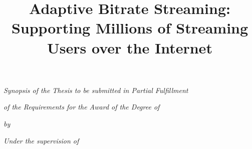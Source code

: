 \title{\fontsize{18}{18} \textbf{Adaptive Bitrate Streaming: Supporting Millions of Streaming Users over the Internet}}

\date{{}}

\vspace{-3.0cm}

\maketitle
\thispagestyle{empty}


{\centering \fontsize{13}{13} \em Synopsis of the Thesis to be
submitted in Partial Fulfillment \par}

{\centering \fontsize{13}{13} \em of the Requirements for the
Award of the Degree of\par}


\vspace{1.0cm}

{\par}

\vspace{0.8cm}

{\centering \fontsize{13}{13} \em by\par}

\vspace{0.5cm}

{\par}

\vspace{0.25cm}

{\par}

\vspace{1.0cm}

{\centering \fontsize{13}{13} \em Under the supervision of\par}

\vspace{0.6cm}

{\par}

